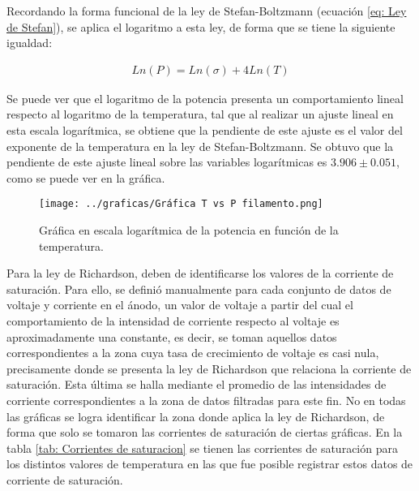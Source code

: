 \documentclass[%
 reprint,
 amsmath,amssymb,
 aps,
]{revtex4-2}
\begin{document}
\vspace{0.2 cm}
Recordando la forma funcional de la ley de Stefan-Boltzmann (ecuación \ref{eq: Ley de Stefan}), se aplica el logaritmo a esta ley, de forma que se tiene la siguiente igualdad:

\begin{align*}
    Ln(P) = Ln(\sigma) + 4Ln(T)
\end{align*}

\vspace{0.2 cm}
Se puede ver que el logaritmo de la potencia presenta un comportamiento lineal respecto al logaritmo de la temperatura, tal que al realizar un ajuste lineal en esta escala logarítmica, se obtiene que la pendiente de este ajuste es el valor del exponente de la temperatura en la ley de Stefan-Boltzmann. Se obtuvo que la pendiente de este ajuste lineal sobre las variables logarítmicas es $3.906 \pm 0.051$, como se puede ver en la gráfica.

\begin{figure}[H]
    \centering
    \texttt{[image: ../graficas/Gráfica T vs P filamento.png]}
    \caption{Gráfica en escala logarítmica de la potencia en función de la temperatura.}
    \label{fig: Gráfica T vs P filamento}
\end{figure}

\vspace{0.2 cm}
Para la ley de Richardson, deben de identificarse los valores de la corriente de saturación. Para ello, se definió manualmente para cada conjunto de datos de voltaje y corriente en el ánodo, un valor de voltaje a partir del cual el comportamiento de la intensidad de corriente respecto al voltaje es aproximadamente una constante, es decir, se toman aquellos datos correspondientes a la zona cuya tasa de crecimiento de voltaje es casi nula, precisamente donde se presenta la ley de Richardson que relaciona la corriente de saturación. Esta última se halla mediante el promedio de las intensidades de corriente correspondientes a la zona de datos filtradas para este fin. No en todas las gráficas se logra identificar la zona donde aplica la ley de Richardson, de forma que solo se tomaron las corrientes de saturación de ciertas gráficas. En la tabla \ref{tab: Corrientes de saturacion} se tienen las corrientes de saturación para los distintos valores de temperatura en las que fue posible registrar estos datos de corriente de saturación. 
\end{document}
